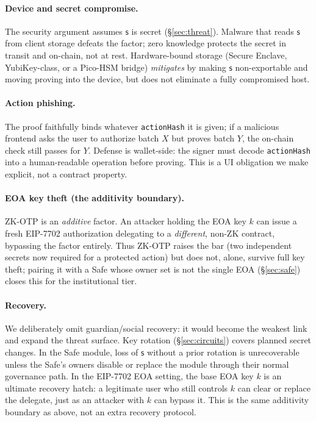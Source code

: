 \documentclass[11pt]{article}
\theoremstyle{definition}
\theoremstyle{plain}
\newcommand{\secret}{\mathsf{s}}
\begin{document}
\paragraph{Device and secret compromise.} The security argument assumes $\secret$ is
secret (\S\ref{sec:threat}). Malware that reads $\secret$ from client storage defeats
the factor; zero knowledge protects the secret in transit and on-chain, not at rest.
Hardware-bound storage (Secure Enclave, YubiKey-class, or a Pico-HSM bridge)
\emph{mitigates} by making $\secret$ non-exportable and moving proving into the
device, but does not eliminate a fully compromised host.

\paragraph{Action phishing.} The proof faithfully binds whatever \texttt{actionHash}
it is given; if a malicious frontend asks the user to authorize batch $X$ but proves
batch $Y$, the on-chain check still passes for $Y$. Defense is wallet-side: the signer
must decode \texttt{actionHash} into a human-readable operation before proving. This is
a UI obligation we make explicit, not a contract property.

\paragraph{EOA key theft (the additivity boundary).} ZK-OTP is an \emph{additive}
factor. An attacker holding the EOA key $k$ can issue a fresh EIP-7702 authorization
delegating to a \emph{different}, non-ZK contract, bypassing the factor entirely. Thus
ZK-OTP raises the bar (two independent secrets now required for a protected action) but
does not, alone, survive full key theft; pairing it with a Safe whose owner set is not
the single EOA (\S\ref{sec:safe}) closes this for the institutional tier.

\paragraph{Recovery.} We deliberately omit guardian/social recovery: it would become
the weakest link and expand the threat surface. Key rotation (\S\ref{sec:circuits})
covers planned secret changes. In the Safe module, loss of $\secret$ without a prior
rotation is unrecoverable unless the Safe's owners disable or replace the module
through their normal governance path. In the EIP-7702 EOA setting, the base EOA key
$k$ is an ultimate recovery hatch: a legitimate user who still controls $k$ can clear
or replace the delegate, just as an attacker with $k$ can bypass it. This is the
same additivity boundary as above, not an extra recovery protocol.
\end{document}
